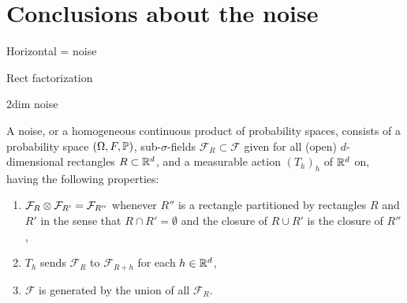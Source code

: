 {
\section{Conclusions about the noise}

Horizontal = noise

Rect factorization

2dim noise

\newcommand{\F}{\mathcal{F}}
A noise, or a homogeneous continuous product of probability
spaces, consists of a probability space $(\Omega,F, \P)$, sub-$\sigma$-fields $\F_R \subset \F$ given for
all (open) $d$-dimensional rectangles $R \subset \R^d$, and a measurable action $(T_h)_h$ of $\R^d$ on, having the following
properties:
\begin{enumerate}
\item $\F_R \tensor \F_{R'} = \F_{R''}$ whenever $R''$ is a
rectangle partitioned by rectangles $R$ and $R'$ in the sense that
$R\cap R'=\emptyset$ and the closure of $R \cup R'$
is the closure of $R''$,
\item $T_h$ sends $\F_R$ to $\F_{R+h}$ for each $h \in \R^d$,
\item $\F$ is generated by the union of all $\F_R$.
\end{enumerate}



}
